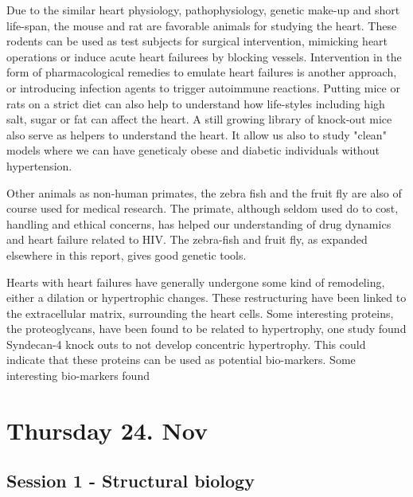\documentclass[12p]{article}
\begin{document}
Due to the similar heart physiology, pathophysiology, genetic make-up and short life-span, the mouse and rat are favorable animals for studying the heart.
These rodents can be used as test subjects for surgical intervention, mimicking heart operations or induce acute heart failurees by blocking vessels.
Intervention in the form of pharmacological remedies to emulate heart failures is another approach, or introducing infection agents to trigger autoimmune reactions.
Putting mice or rats on a strict diet can also help to understand how life-styles including high salt, sugar or fat can affect the heart.
A still growing library of knock-out mice also serve as helpers to understand the heart.
It allow us also to study "clean" models where we can have geneticaly obese and diabetic individuals without hypertension.

Other animals as non-human primates, the zebra fish and the fruit fly are also of course used for medical research.
The primate, although seldom used do to cost, handling and ethical concerns, has helped our understanding of drug dynamics and heart failure related to HIV.
The zebra-fish and fruit fly, as expanded elsewhere in this report, gives good genetic tools.

Hearts with heart failures have generally undergone some kind of remodeling, either a dilation or hypertrophic changes.
These restructuring have been linked to the extracellular matrix, surrounding the heart cells.
Some interesting proteins, the proteoglycans, have been found to be related to hypertrophy, one study found Syndecan-4 knock outs to not develop concentric hypertrophy.
This could indicate that these proteins can be used as potential bio-markers.
Some interesting bio-markers found 

\section*{Thursday 24. Nov}

\subsection*{Session 1 - Structural biology}
\end{document}
